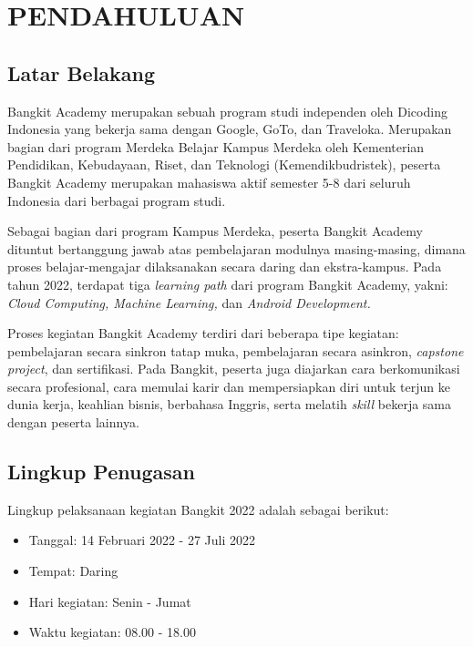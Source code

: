 \chapter{PENDAHULUAN}
\section{Latar Belakang}
Bangkit Academy merupakan sebuah program studi independen oleh Dicoding Indonesia yang bekerja sama dengan Google, GoTo, dan Traveloka. Merupakan bagian dari program Merdeka Belajar Kampus Merdeka oleh Kementerian Pendidikan, Kebudayaan, Riset, dan Teknologi (Kemendikbudristek), peserta Bangkit Academy merupakan mahasiswa aktif semester 5-8 dari seluruh Indonesia dari berbagai program studi.

Sebagai bagian dari program Kampus Merdeka, peserta Bangkit Academy dituntut bertanggung jawab atas pembelajaran modulnya masing-masing, dimana proses belajar-mengajar dilaksanakan secara daring dan ekstra-kampus. Pada tahun 2022, terdapat tiga \textit{learning path} dari program Bangkit Academy, yakni: \textit{Cloud Computing, Machine Learning,} dan \textit{Android Development.}

Proses kegiatan Bangkit Academy terdiri dari beberapa tipe kegiatan: pembelajaran secara sinkron tatap muka, pembelajaran secara asinkron, \textit{capstone project}, dan sertifikasi. Pada Bangkit, peserta juga diajarkan cara berkomunikasi secara profesional, cara memulai karir dan mempersiapkan diri untuk terjun ke dunia kerja, keahlian bisnis, berbahasa Inggris, serta melatih \textit{skill} bekerja sama dengan peserta lainnya.

\section{Lingkup Penugasan}
Lingkup pelaksanaan kegiatan Bangkit 2022 adalah sebagai berikut:
\begin{itemize}
	\item Tanggal: 14 Februari 2022 - 27 Juli 2022
	\item Tempat: Daring
	\item Hari kegiatan: Senin - Jumat
	\item Waktu kegiatan: 08.00 - 18.00
\end{itemize}

